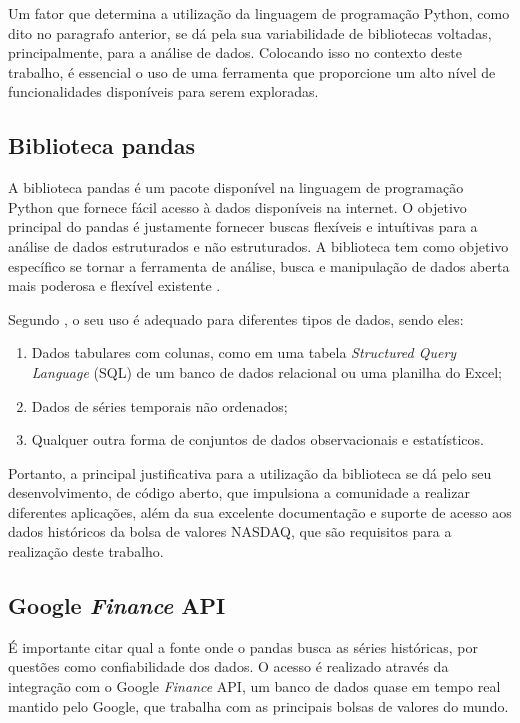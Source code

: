 Um fator que determina a utilização da linguagem de programação Python, como dito no paragrafo anterior, se dá pela sua variabilidade de bibliotecas voltadas, principalmente, para a análise de dados. Colocando isso no contexto deste trabalho, é essencial o uso de uma ferramenta que proporcione um alto nível de funcionalidades disponíveis para serem exploradas.

\subsection{Biblioteca pandas}\label{pandas-lib}
A biblioteca pandas é um pacote disponível na linguagem de programação Python que fornece fácil acesso à dados disponíveis na internet. O objetivo principal do pandas é justamente fornecer buscas flexíveis e intuítivas para a análise de dados estruturados e não estruturados. A biblioteca tem como objetivo específico se tornar a ferramenta de análise, busca e manipulação de dados aberta mais poderosa e flexível existente \cite{pandas}.

Segundo , o seu uso é adequado para diferentes tipos de dados, sendo eles:
\begin{enumerate}
\item Dados tabulares com colunas, como em uma tabela \textit{Structured Query Language} (SQL) de um banco de dados relacional ou uma planilha do Excel;
\item Dados de séries temporais não ordenados;
\item Qualquer outra forma de conjuntos de dados observacionais e estatísticos.
\end{enumerate}

Portanto, a principal justificativa para a utilização da biblioteca se dá pelo seu desenvolvimento, de código aberto, que impulsiona a comunidade a realizar diferentes aplicações, além da sua excelente documentação e suporte de acesso aos dados históricos da bolsa de valores NASDAQ, que são requisitos para a realização deste trabalho.

\subsection{Google \textit{Finance} API}
É importante citar qual a fonte onde o pandas busca as séries históricas, por questões como confiabilidade dos dados. O acesso é realizado através da integração com o Google \textit{Finance} API, um banco de dados quase em tempo real mantido pelo Google, que trabalha com as principais bolsas de valores do mundo.

